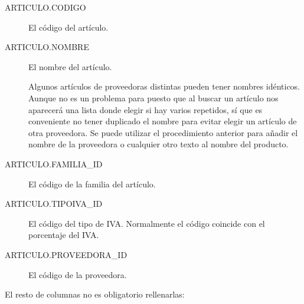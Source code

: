 \begin{description}
 \item [ARTICULO.CODIGO] {El código del artículo. \par 
 }
 \item [ARTICULO.NOMBRE] {El nombre del artículo.\par
 Algunos artículos de proveedoras distintas pueden tener nombres idénticos. Aunque no es un problema para \appname puesto que al buscar un artículo nos aparecerá una lista donde elegir si hay varios repetidos, sí que es conveniente no tener duplicado el nombre para evitar elegir un artículo de otra proveedora. Se puede utilizar el procedimiento anterior para añadir el nombre de la proveedora o cualquier otro texto al nombre del producto.
 }
 \item [ARTICULO.FAMILIA\_ID] {El código de la familia del artículo.}
 \item [ARTICULO.TIPOIVA\_ID] {El código del tipo de IVA. Normalmente el código coincide con el porcentaje del IVA.}
 \item [ARTICULO.PROVEEDORA\_ID] {El código de la proveedora.}
\end{description}

El resto de columnas no es obligatorio rellenarlas:

